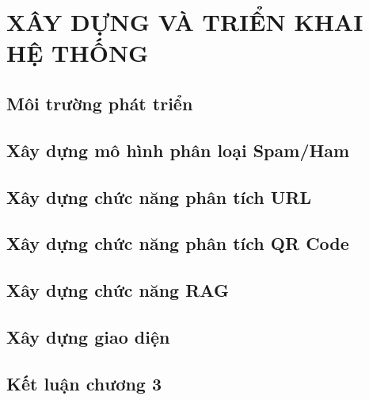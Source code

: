 \clearpage
\chapter{XÂY DỰNG VÀ TRIỂN KHAI HỆ THỐNG}
\section{Môi trường phát triển}
\section{Xây dựng mô hình phân loại Spam/Ham}
\section{Xây dựng chức năng phân tích URL}
\section{Xây dựng chức năng phân tích QR Code}
\section{Xây dựng chức năng RAG}
\section{Xây dựng giao diện}
\section{Kết luận chương 3}

